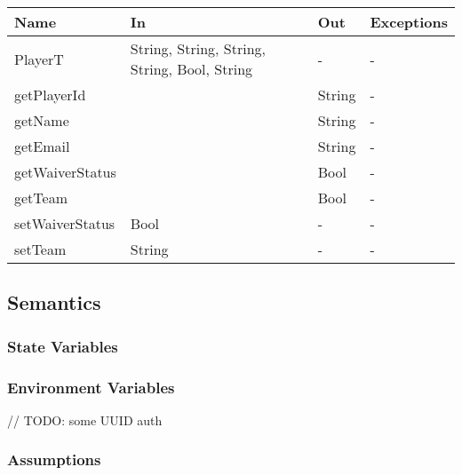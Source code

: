 \documentclass[12pt, titlepage]{article}
\begin{document}
\begin{itemize}
\begin{center}
  \begin{tabular}{|p{4cm}| p{4cm}| p{4cm} | p{3cm}|}
    \hline
    \textbf{Name}   & \textbf{In}                                  & \textbf{Out} & \textbf{Exceptions} \\
    \hline
    PlayerT         & String, String, String, String, Bool, String & -            & -                   \\
    getPlayerId     &                                              & String       & -                   \\
    getName         &                                              & String       & -                   \\
    getEmail        &                                              & String       & -                   \\
    getWaiverStatus &                                              & Bool         & -                   \\
    getTeam         &                                              & Bool         & -                   \\
    setWaiverStatus & Bool                                         & -            & -                   \\
    setTeam         & String                                       & -            & -                   \\
    \hline
  \end{tabular}
\end{center}

\subsection{Semantics}

\subsubsection{State Variables}

\subsubsection{Environment Variables}

// TODO: some UUID auth

\subsubsection{Assumptions}


\end{itemize}
\end{document}
